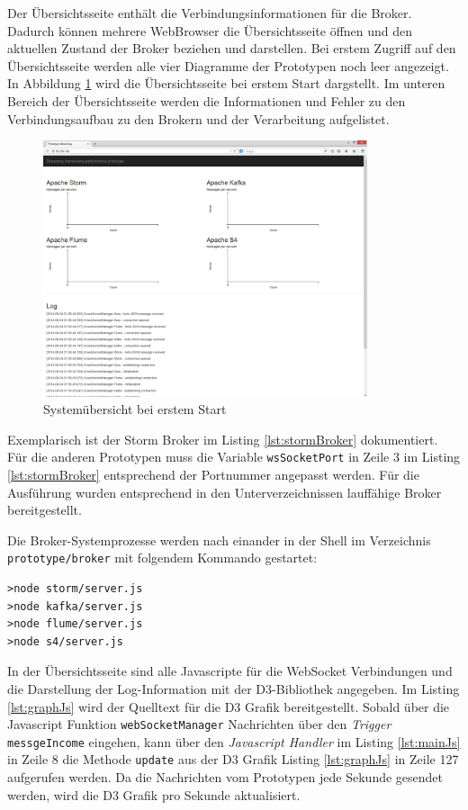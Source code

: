 Der Übersichtsseite enthält die Verbindungsinformationen für die Broker. Dadurch können mehrere WebBrowser die Übersichtsseite öffnen und den aktuellen Zustand der Broker beziehen und darstellen. Bei erstem Zugriff auf den Übersichtsseite werden alle vier Diagramme der Prototypen noch leer angezeigt. In Abbildung \ref{fig:systemOverviewStart} wird die Übersichtsseite bei erstem Start dargstellt. Im unteren Bereich der Übersichtsseite werden die Informationen und Fehler zu den Verbindungsaufbau zu den Brokern und der Verarbeitung aufgelistet. 

\begin{figure}[htb!]
\centering
\includegraphics[width=0.85\textwidth]{bilder/PrototypeStreaming001.png}
\caption{Systemübersicht bei erstem Start
\label{fig:systemOverviewStart}}
\end{figure}

Exemplarisch ist der Storm Broker im Listing \ref{lst:stormBroker} dokumentiert. Für die anderen Prototypen muss die Variable \texttt{wsSocketPort} in Zeile 3 im Listing \ref{lst:stormBroker} entsprechend der Portnummer angepasst werden. Für die Ausführung wurden entsprechend in den Unterverzeichnissen lauffähige Broker bereitgestellt.

Die Broker-Systemprozesse werden nach einander in der Shell im Verzeichnis \texttt{prototype/broker} mit folgendem Kommando gestartet:
\begin{verbatim}
>node storm/server.js
>node kafka/server.js
>node flume/server.js
>node s4/server.js
\end{verbatim}

In der Übersichtsseite sind alle Javascripte für die WebSocket Verbindungen und die Darstellung der Log-Information mit der D3-Bibliothek angegeben. Im Listing \ref{lst:graphJs} wird der Quelltext für die D3 Grafik bereitgestellt. Sobald über die Javascript Funktion \texttt{webSocketManager} Nachrichten über den \textit{Trigger} \texttt{messgeIncome} eingehen, kann über den \textit{Javascript Handler} im Listing \ref{lst:mainJs} in Zeile 8 die Methode \texttt{update} aus der D3 Grafik Listing \ref{lst:graphJs} in Zeile 127 aufgerufen werden. Da die Nachrichten vom Prototypen jede Sekunde gesendet werden, wird die D3 Grafik pro Sekunde aktualisiert.

